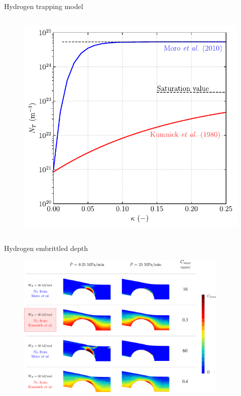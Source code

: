 \documentclass[9pt]{beamer}
\begin{document}
\begin{frame}{Hydrogen trapping model}
\begin{columns}
	\begin{column}{0.45\textwidth}
	\begin{figure}
		\centering
		\includegraphics[width=1.0\textwidth]{Images/plot_NT_epcum.pdf} \\
	\end{figure}
	\end{column}
\end{columns}

\end{frame}


\begin{frame}{Hydrogen embrittled depth}

\begin{figure}
	\centering
	\includegraphics[width=0.9\textwidth]{Images/table_zoom.pdf} \\
\end{figure}

\end{frame}
\end{document}
